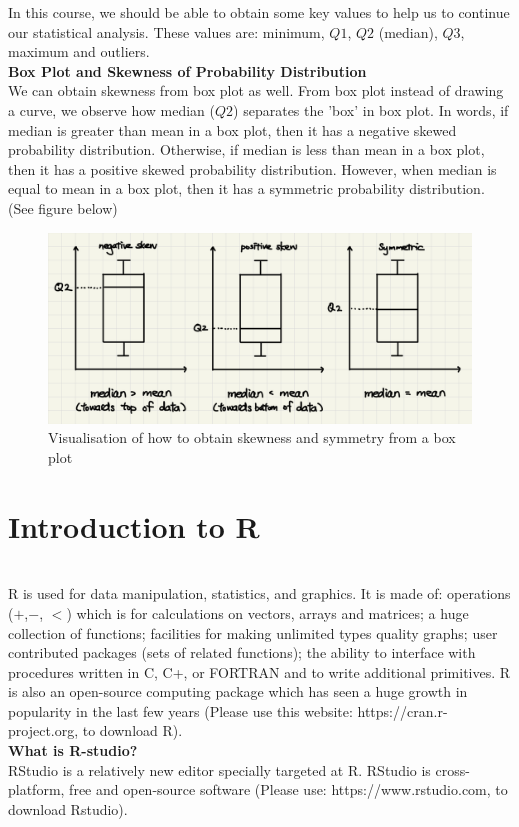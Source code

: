 In this course, we should be able to obtain some key values to help us to continue our statistical analysis. These values are: minimum, $Q1$, $Q2$ (median), $Q3$, maximum and outliers.\\

\noindent
\textbf{Box Plot and Skewness of Probability Distribution}\\

\noindent
We can obtain skewness from box plot as well. From box plot instead of drawing a curve, we observe how median ($Q2$) separates the 'box' in box plot. In words, if median is greater than mean in a box plot, then it has a negative skewed probability distribution. Otherwise, if median is less than mean in a box plot, then it has a positive skewed probability distribution. However, when median is equal to mean in a box plot, then it has a symmetric probability distribution. (See figure below)

\begin{figure}[H]
 \centering
 \includegraphics[scale=0.20]{Section1/img/BoxSk.jpg}
 \caption{Visualisation of how to obtain skewness and symmetry from a box plot}
\end{figure}

\section{Introduction to R}\\

\noindent
R is used for data manipulation, statistics, and graphics. It is made of: operations ($+$,$ -$, $<$) which is for calculations on vectors, arrays and matrices; a huge collection of functions; facilities for making unlimited types quality graphs; user contributed packages (sets of related functions); the ability to interface with procedures written in C, C+, or FORTRAN and to write additional primitives. R is also an open-source computing package which has seen a huge growth in popularity in the last few years (Please use this website: https://cran.r-project.org, to download R).\\

\noindent
\textbf{What is R-studio?}\\

\noindent
RStudio is a relatively new editor specially targeted at R. RStudio is cross-platform, free and open-source software (Please use: https://www.rstudio.com, to download Rstudio).






